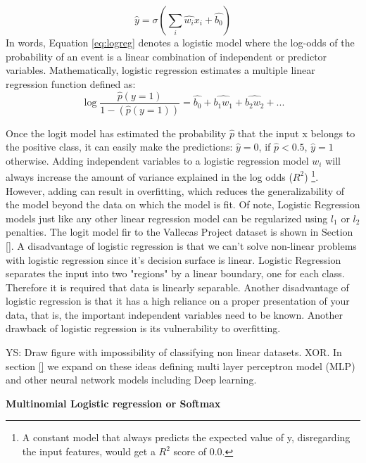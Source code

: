\documentclass[11pt]{article}
\begin{document}
\begin{equation}
\hat{y} = \sigma(\sum_i \hat{w_i}x_i +\hat{b_0})
\label{eq:logreg}
\end{equation}
In words, Equation \ref{eq:logreg} denotes a logistic model where the log-odds of the probability of an event is a linear combination of independent or predictor variables. Mathematically, logistic regression estimates a multiple linear regression function defined as:
\begin{equation}
\log \frac{\hat{p}(y=1)}{1-(\hat{p}(y=1))} = \hat{b_0} + \hat{b_1w_1} + \hat{b_2w_2} + ...
\label{eq:logreg2}
\end{equation}

Once the logit model has estimated the probability $\hat{p}$ that the input x belongs to the positive class, it can easily make the predictions: $\hat{y} = 0$, if $\hat{p} < 0.5$, $\hat{y} = 1$ otherwise. Adding independent variables to a logistic regression model $w_i$ will always increase the amount of variance explained in the log odds ($R^2$) \footnote{A constant model that always predicts the expected value of y, disregarding the input features, would get a $R^2$ score of 0.0.}. However, adding can result in overfitting, which reduces the generalizability of the model beyond the data on which the model is fit. Of note, Logistic Regression models just like any other linear regression model can be regularized using $l_1$ or $l_2$ penalties. The logit model fir to the Vallecas Project dataset is shown in Section \ref{}.
A disadvantage of logistic regression is that we can’t solve non-linear problems with logistic regression since it’s decision surface is linear. 
Logistic Regression separates the input into two "regions" by a linear boundary, one for each class. Therefore it is required that data is linearly separable. Another disadvantage of logistic regression is that it has a high reliance on a proper presentation of your data, that is, the important independent variables need to be known. 
Another drawback of logistic regression is its vulnerability to overfitting.

YS: Draw figure with impossibility of classifying non linear datasets. XOR. In section \ref{} we expand on these ideas defining multi layer perceptron model (MLP) and other neural network models including Deep learning.

\textbf{Multinomial Logistic regression or Softmax}
\end{document}
